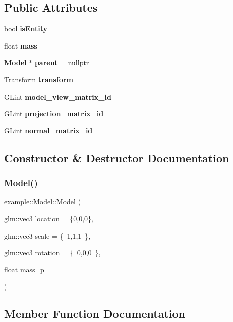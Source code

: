 \subsection*{Public Attributes}
\begin{DoxyCompactItemize}
\item 
bool \textbf{ is\+Entity}
\item 
float \textbf{ mass}
\item 
\textbf{ Model} $\ast$ \textbf{ parent} = nullptr
\item 
Transform \textbf{ transform}
\item 
G\+Lint \textbf{ model\+\_\+view\+\_\+matrix\+\_\+id}
\item 
G\+Lint \textbf{ projection\+\_\+matrix\+\_\+id}
\item 
G\+Lint \textbf{ normal\+\_\+matrix\+\_\+id}
\end{DoxyCompactItemize}


\subsection{Constructor \& Destructor Documentation}
\mbox{\label{classexample_1_1_model_afa157afc835b35c76a261b2b388d8d6f}} 
\subsubsection{Model()}
{\footnotesize\ttfamily example\+::\+Model\+::\+Model (\begin{DoxyParamCaption}\item[{glm\+::vec3}]{location = {\ttfamily \{0,0,0\}},  }\item[{glm\+::vec3}]{scale = {\ttfamily \{~1,1,1~\}},  }\item[{glm\+::vec3}]{rotation = {\ttfamily \{~0,0,0~\}},  }\item[{float}]{mass\+\_\+p = {} }\end{DoxyParamCaption})\hspace{0.3cm}{\ttfamily [inline]}}



\subsection{Member Function Documentation}
\mbox{\label{classexample_1_1_model_a97575d40c10929e02b0b8dfbc1a926d3}} 
